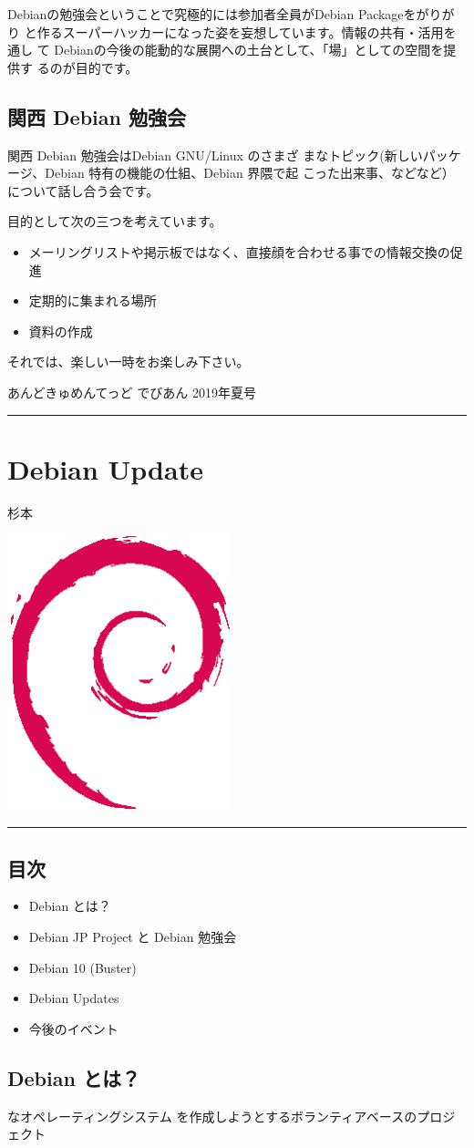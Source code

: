 \documentclass[mingoth,a4paper]{jsarticle}
\renewcommand{\dancersection}[2]{%
\newpage
あんどきゅめんてっど でびあん 2019年夏号
%
\vspace{0.1mm}\\
{\color{dancerdarkblue}\rule{\hsize}{2mm}}

%
%
\begin{minipage}[t]{0.6\hsize}
\color{dancerdarkblue}
\vspace{1cm}
\section{#1}
\hfill{}#2\\
\end{minipage}
\begin{minipage}[t]{0.4\hsize}
\vspace{-2cm}
\hfill{}\includegraphics[height=8cm]{image200502/openlogo-nd.eps}\\
\vspace{-5cm}
\end{minipage}
%
{\color{dancerlightblue}\rule{0.66\hsize}{2mm}}
%
\vspace{2cm}
}
\begin{document}
 Debianの勉強会ということで究極的には参加者全員がDebian Packageをがりがり
 と作るスーパーハッカーになった姿を妄想しています。情報の共有・活用を通し
 て Debianの今後の能動的な展開への土台として、「場」としての空間を提供す
 るのが目的です。

\subsection{関西 Debian 勉強会}

 関西 Debian 勉強会はDebian GNU/Linux のさまざ
 まなトピック(新しいパッケージ、Debian 特有の機能の仕組、Debian 界隈で起
 こった出来事、などなど）について話し合う会です。

 目的として次の三つを考えています。
 \begin{itemize}
  \item メーリングリストや掲示板ではなく、直接顔を合わせる事での情報交換の促進
  \item 定期的に集まれる場所
  \item 資料の作成
 \end{itemize}

 それでは、楽しい一時をお楽しみ下さい。

\dancersection{Debian Update}{杉本}
\subsection{目次}

  \begin{itemize}
  \item Debian とは？
  \item Debian JP Project と Debian 勉強会
  \item Debian 10 (Buster)
  \item Debian Updates
  \item 今後のイベント
  \end{itemize}



\subsection{Debian とは？}

{\color{red}{フリー/オープン}}な{\color{red}{ユニバーサル}}オペレーティングシステム を作成しようとするボランティアベースのプロジェクト
\end{document}
